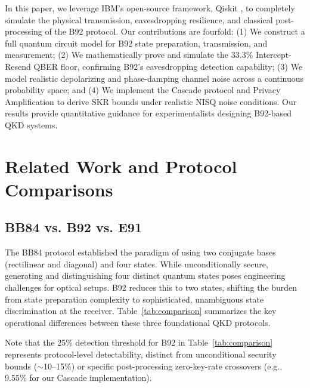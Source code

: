 \documentclass[conference]{IEEEtran}
\begin{document}
In this paper, we leverage IBM's open-source framework, Qiskit \cite{qiskit}, to completely simulate the physical transmission, eavesdropping resilience, and classical post-processing of the B92 protocol. Our contributions are fourfold: (1) We construct a full quantum circuit model for B92 state preparation, transmission, and measurement; (2) We mathematically prove and simulate the 33.3\% Intercept-Resend QBER floor, confirming B92's eavesdropping detection capability; (3) We model realistic depolarizing and phase-damping channel noise across a continuous probability space; and (4) We implement the Cascade protocol and Privacy Amplification to derive SKR bounds under realistic NISQ noise conditions. Our results provide quantitative guidance for experimentalists designing B92-based QKD systems.

\section{Related Work and Protocol Comparisons}\label{sec:related}
\subsection{BB84 vs. B92 vs. E91}
The BB84 protocol \cite{bennett1984quantum} established the paradigm of using two conjugate bases (rectilinear and diagonal) and four states. While unconditionally secure, generating and distinguishing four distinct quantum states poses engineering challenges for optical setups. B92 reduces this to two states, shifting the burden from state preparation complexity to sophisticated, unambiguous state discrimination at the receiver. Table~\ref{tab:comparison} summarizes the key operational differences between these three foundational QKD protocols.

Note that the 25\% detection threshold for B92 in Table~\ref{tab:comparison} represents protocol-level detectability, distinct from unconditional security bounds ($\sim$10--15\%) or specific post-processing zero-key-rate crossovers (e.g., 9.55\% for our Cascade implementation).

\begin{table}[htbp]
\caption{Comparative Analysis of Foundational QKD Protocols}
\label{tab:comparison}
\centering
\small
{}
\end{table}
\end{document}
